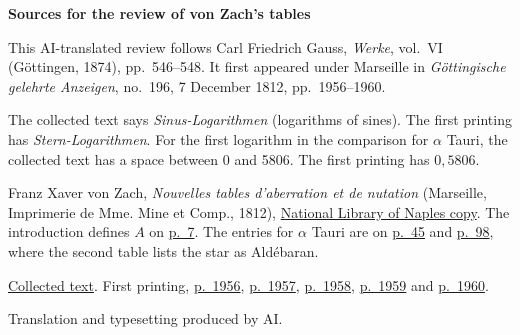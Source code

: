 \clearpage\thispagestyle{empty}
\begin{center}\textbf{Sources for the review of von Zach's tables}\end{center}
\noindent This AI-translated review follows Carl Friedrich Gauss, \textit{Werke}, vol.~VI (Göttingen, 1874), pp.~546--548. It first appeared under Marseille in \textit{Göttingische gelehrte Anzeigen}, no.~196, 7 December 1812, pp.~1956--1960.
\par\smallskip\noindent The collected text says \textit{Sinus-Logarithmen} (logarithms of sines). The first printing has \textit{Stern-Logarithmen}. For the first logarithm in the comparison for \(\alpha\) Tauri, the collected text has a space between 0 and 5806. The first printing has \(0{,}5806\).
\par\smallskip\noindent Franz Xaver von Zach, \textit{Nouvelles tables d'aberration et de nutation} (Marseille, Imprimerie de Mme. Mine et Comp., 1812), \href{https://archive.org/details/bub_gb_-oek6b4alfwC}{National Library of Naples copy}. The introduction defines \(A\) on \href{https://archive.org/download/bub_gb_-oek6b4alfwC/bub_gb_-oek6b4alfwC.pdf#page=11}{p.~7}. The entries for \(\alpha\) Tauri are on \href{https://archive.org/download/bub_gb_-oek6b4alfwC/bub_gb_-oek6b4alfwC.pdf#page=105}{p.~45} and \href{https://archive.org/download/bub_gb_-oek6b4alfwC/bub_gb_-oek6b4alfwC.pdf#page=158}{p.~98}, where the second table lists the star as Aldébaran.
\par\smallskip\noindent \href{https://gdz.sub.uni-goettingen.de/id/PPN236007467}{Collected text}. First printing, \href{https://images.p.sub.uni-goettingen.de/iiif/image/gdz:PPN319721507_1812:00002000/full/1650,/0/default.jpg}{p.~1956}, \href{https://images.p.sub.uni-goettingen.de/iiif/image/gdz:PPN319721507_1812:00002001/full/1650,/0/default.jpg}{p.~1957}, \href{https://images.p.sub.uni-goettingen.de/iiif/image/gdz:PPN319721507_1812:00002002/full/1650,/0/default.jpg}{p.~1958}, \href{https://images.p.sub.uni-goettingen.de/iiif/image/gdz:PPN319721507_1812:00002003/full/1650,/0/default.jpg}{p.~1959} and \href{https://images.p.sub.uni-goettingen.de/iiif/image/gdz:PPN319721507_1812:00002004/full/1650,/0/default.jpg}{p.~1960}.
\par\smallskip\noindent Translation and typesetting produced by AI.
\clearpage
